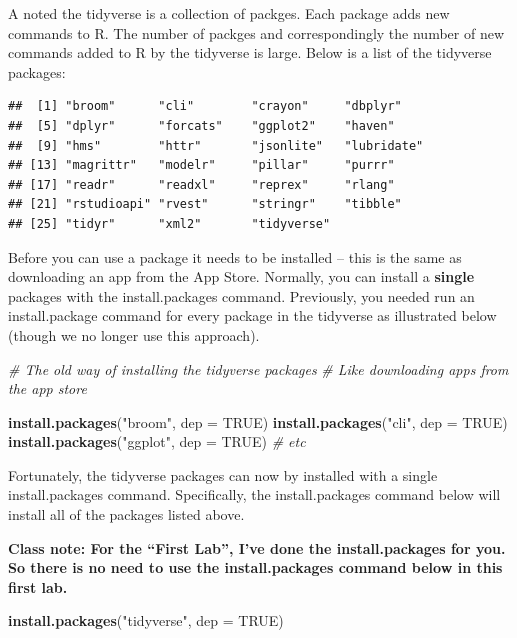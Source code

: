 \documentclass[
]{krantz}
\makeatletter
\newenvironment{Shaded}{\begin{snugshade}}{\end{snugshade}}
\newcommand{\CommentTok}[1]{\textcolor[rgb]{0.37,0.37,0.37}{\textit{#1}}}
\newcommand{\DataTypeTok}[1]{\textcolor[rgb]{0.27,0.27,0.27}{#1}}
\newcommand{\KeywordTok}[1]{\textcolor[rgb]{0.27,0.27,0.27}{\textbf{#1}}}
\newcommand{\NormalTok}[1]{#1}
\newcommand{\OtherTok}[1]{\textcolor[rgb]{0.37,0.37,0.37}{#1}}
\newcommand{\StringTok}[1]{\textcolor[rgb]{0.5,0.5,0.5}{#1}}
\newenvironment{kframe}{%
\medskip{}
\setlength{\fboxsep}{.8em}
 \def\at@end@of@kframe{}%
 \ifinner\ifhmode%
  \def\at@end@of@kframe{\end{minipage}}%
  \begin{minipage}{\columnwidth}%
 \fi\fi%
 \def\FrameCommand##1{\hskip\@totalleftmargin \hskip-\fboxsep
 \colorbox{shadecolor}{##1}\hskip-\fboxsep
     \hskip-\linewidth \hskip-\@totalleftmargin \hskip\columnwidth}%
 \MakeFramed {\advance\hsize-\width
   \@totalleftmargin\z@ \linewidth\hsize
   \@setminipage}}%
 {\par\unskip\endMakeFramed%
 \at@end@of@kframe}
\renewenvironment{Shaded}{\begin{kframe}}{\end{kframe}}
\makeatother
\begin{document}
A noted the tidyverse is a collection of packges. Each package adds new commands to R. The number of packges and correspondingly the number of new commands added to R by the tidyverse is large. Below is a list of the tidyverse packages:

\begin{verbatim}
##  [1] "broom"      "cli"        "crayon"     "dbplyr"    
##  [5] "dplyr"      "forcats"    "ggplot2"    "haven"     
##  [9] "hms"        "httr"       "jsonlite"   "lubridate" 
## [13] "magrittr"   "modelr"     "pillar"     "purrr"     
## [17] "readr"      "readxl"     "reprex"     "rlang"     
## [21] "rstudioapi" "rvest"      "stringr"    "tibble"    
## [25] "tidyr"      "xml2"       "tidyverse"
\end{verbatim}

Before you can use a package it needs to be installed -- this is the same as downloading an app from the App Store. Normally, you can install a \textbf{single} packages with the install.packages command. Previously, you needed run an install.package command for every package in the tidyverse as illustrated below (though we no longer use this approach).

\begin{Shaded}
\begin{Highlighting}[]
\CommentTok{# The old way of installing the tidyverse packages}
\CommentTok{# Like downloading apps from the app store}

\KeywordTok{install.packages}\NormalTok{(}\StringTok{"broom"}\NormalTok{, }\DataTypeTok{dep =} \OtherTok{TRUE}\NormalTok{)}
\KeywordTok{install.packages}\NormalTok{(}\StringTok{"cli"}\NormalTok{, }\DataTypeTok{dep =} \OtherTok{TRUE}\NormalTok{)}
\KeywordTok{install.packages}\NormalTok{(}\StringTok{"ggplot"}\NormalTok{, }\DataTypeTok{dep =} \OtherTok{TRUE}\NormalTok{)}
\CommentTok{# etc}
\end{Highlighting}
\end{Shaded}

Fortunately, the tidyverse packages can now by installed with a single install.packages command. Specifically, the install.packages command below will install all of the packages listed above.

\textbf{Class note: For the ``First Lab'', I've done the install.packages for you. So there is no need to use the install.packages command below in this first lab.}

\begin{Shaded}
\begin{Highlighting}[]
\KeywordTok{install.packages}\NormalTok{(}\StringTok{"tidyverse"}\NormalTok{, }\DataTypeTok{dep =} \OtherTok{TRUE}\NormalTok{)}
\end{Highlighting}
\end{Shaded}
\end{document}
